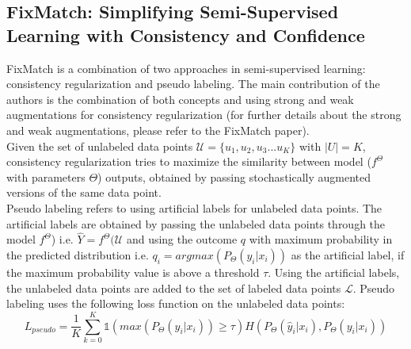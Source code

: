 \subsection{FixMatch: Simplifying Semi-Supervised Learning with Consistency and Confidence}
FixMatch\cite{sohn2020} is a combination of two approaches in semi-supervised learning: consistency regularization\cite{sajjadi2016} and pseudo labeling\cite{mclachlan1975}. The main contribution of the authors is the combination of both concepts and using strong and weak augmentations for consistency regularization (for further details about the strong and weak augmentations, please refer to the FixMatch paper). \\
Given the set of unlabeled data points $\mathcal{U} = \{u_1, u_2, u_3 ... u_K\}$ with $|U| = K$, consistency regularization tries to maximize the similarity between model ($f^\Theta$ with parameters $\Theta$) outputs, obtained by passing stochastically augmented versions of the same data point. \\
Pseudo labeling refers to using artificial labels for unlabeled data points. The artificial labels are obtained by passing the unlabeled data points through the model $f^\Theta$) i.e. $\hat{Y} = f^\Theta(\mathcal{U}$ and using the outcome $q$ with maximum probability in the predicted distribution i.e. $q_i = argmax(P_{\Theta}(y_i | x_i))$ as the artificial label, if the maximum probability value is above a threshold $\tau$. Using the artificial labels, the unlabeled data points are added to the set of labeled data points $\mathcal{L}$. Pseudo labeling uses the following loss function on the unlabeled data points:
\begin{equation}
    \label{equation:fixmatch_pseudo_labeling_loss}
    L_{pseudo} = \frac{1}{K} \sum_{k=0}^{K} \mathbb{1}(max(P_{\Theta}(y_i | x_i)) \geq \tau) H(P_{\Theta}(\hat{y}_i | x_i), P_{\Theta}(y_i | x_i))
\end{equation}

